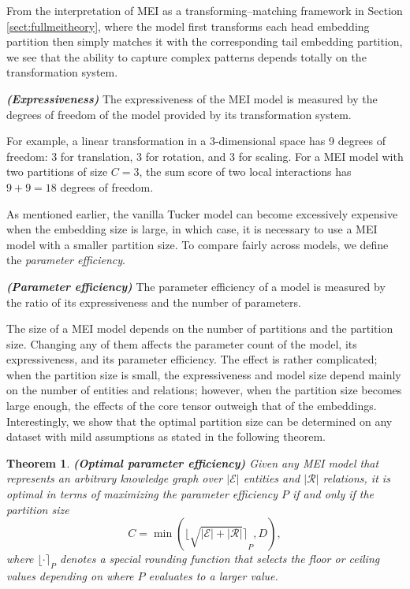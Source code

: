 \documentclass{ecai}
\def\gE{{\mathcal{E}}}
\def\gR{{\mathcal{R}}}
\theoremstyle{plain}  \newtheorem{thm}{Theorem}  \newtheorem{lem}[thm]{Lemma}  \newtheorem{prop}[thm]{Proposition}
\theoremstyle{remark}  \newtheorem*{rem}{Remark}
\newcommand{\round}[1]{{\lfloor{#1}\rceil}}
\begin{document}
From the interpretation of MEI as a transforming--matching framework in Section \ref{sect:fullmeitheory}, where the model first transforms each head embedding partition then simply matches it with the corresponding tail embedding partition, we see that the ability to capture complex patterns depends totally on the transformation system.
\begin{defn} \textbf{\textit{(Expressiveness)}} \label{def:expressive}
	The expressiveness of the MEI model is measured by the degrees of freedom of the model provided by its transformation system. 
\end{defn}
For example, a linear transformation in a $ 3 $-dimensional space has 9 degrees of freedom: 3 for translation, 3 for rotation, and 3 for scaling. For a MEI model with two partitions of size $ C = 3 $, the sum score of two local interactions has $ 9 + 9 = 18 $ degrees of freedom.

As mentioned earlier, the vanilla Tucker model can become excessively expensive when the embedding size is large, in which case, it is necessary to use a MEI model with a smaller partition size. To compare fairly across models, we define the \textit{parameter efficiency}.
\begin{defn} \textbf{\textit{(Parameter efficiency)}} \label{def:paramefficient}
	The parameter efficiency of a model is measured by the ratio of its expressiveness and the number of parameters. 
\end{defn}

The size of a MEI model depends on the number of partitions and the partition size. Changing any of them affects the parameter count of the model, its expressiveness, and its parameter efficiency. The effect is rather complicated; when the partition size is small, the expressiveness and model size depend mainly on the number of entities and relations; however, when the partition size becomes large enough, the effects of the core tensor outweigh that of the embeddings. Interestingly, we show that the optimal partition size can be determined on any dataset with mild assumptions as stated in the following theorem.

\begin{thm} \textbf{\textit{(Optimal parameter efficiency)}} \label{thm:optimalefficiency}
	Given any MEI model that represents an arbitrary knowledge graph over $ |\gE| $ entities and $ |\gR| $ relations, it is optimal in terms of maximizing the parameter efficiency $ P $ if and only if the partition size $$ \textstyle C = \min(\round{\sqrt{|\gE| + |\gR|}}_{P}, D), $$ where $ \round{\cdot}_{P} $ denotes a special rounding function that selects the floor or ceiling values depending on where $ P $ evaluates to a larger value.
\end{thm}
\end{document}
